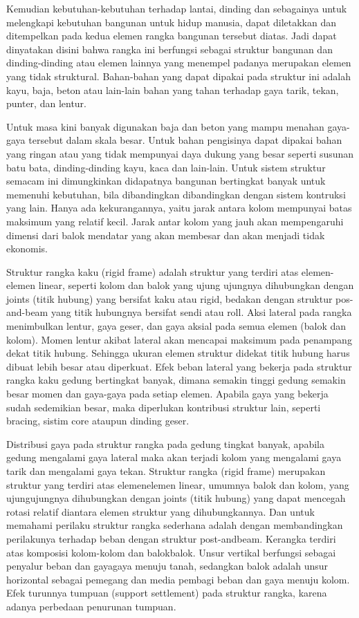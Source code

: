 \documentclass[../modul_skb.tex]{subfiles}
\begin{document}
Kemudian kebutuhan-kebutuhan terhadap lantai, dinding dan sebagainya untuk melengkapi kebutuhan bangunan untuk hidup manusia, dapat diletakkan dan ditempelkan pada kedua elemen rangka bangunan tersebut diatas. Jadi dapat dinyatakan disini bahwa rangka ini berfungsi sebagai struktur bangunan dan dinding-dinding atau elemen lainnya yang menempel padanya merupakan elemen yang tidak struktural. Bahan-bahan yang dapat dipakai pada struktur ini adalah kayu, baja, beton atau lain-lain bahan yang tahan terhadap gaya tarik, tekan, punter, dan lentur.

Untuk masa kini banyak digunakan baja dan beton yang mampu menahan gaya-gaya tersebut dalam skala besar. Untuk bahan pengisinya dapat dipakai bahan yang ringan atau yang tidak mempunyai daya dukung yang besar seperti susunan batu bata, dinding-dinding kayu, kaca dan lain-lain. Untuk sistem struktur semacam ini dimungkinkan didapatnya bangunan bertingkat banyak untuk memenuhi kebutuhan, bila dibandingkan dibandingkan dengan sistem kontruksi yang lain. Hanya ada kekurangannya, yaitu jarak antara kolom mempunyai batas maksimum yang relatif kecil. Jarak antar kolom yang jauh akan mempengaruhi dimensi dari balok mendatar yang akan membesar dan akan menjadi tidak
ekonomis.

Struktur rangka kaku (rigid frame) adalah struktur yang terdiri atas elemen-elemen linear, seperti kolom dan balok yang ujung ujungnya dihubungkan dengan joints (titik hubung) yang bersifat kaku atau rigid, bedakan dengan struktur pos-and-beam yang titik hubungnya bersifat sendi atau roll. Aksi lateral pada rangka menimbulkan lentur, gaya geser, dan gaya aksial pada semua elemen (balok dan kolom). Momen lentur akibat lateral akan mencapai maksimum pada penampang dekat titik hubung. Sehingga ukuran elemen struktur didekat titik hubung harus dibuat lebih besar atau diperkuat. Efek beban lateral yang bekerja pada struktur rangka kaku gedung bertingkat banyak, dimana semakin tinggi gedung semakin besar momen dan gaya-gaya pada setiap elemen. Apabila gaya yang bekerja sudah sedemikian besar, maka diperlukan kontribusi struktur lain, seperti bracing, sistim core ataupun dinding geser.

Distribusi gaya pada struktur rangka pada gedung tingkat banyak, apabila gedung mengalami gaya lateral maka akan terjadi kolom yang mengalami gaya tarik dan mengalami gaya tekan. Struktur rangka (rigid frame) merupakan struktur yang terdiri atas elemenelemen linear, umumnya balok dan kolom, yang ujungujungnya dihubungkan dengan joints (titik hubung) yang dapat mencegah rotasi relatif diantara elemen struktur yang dihubungkannya. Dan untuk memahami perilaku struktur rangka sederhana adalah dengan membandingkan perilakunya terhadap beban dengan struktur post-andbeam. Kerangka terdiri atas komposisi kolom-kolom dan balokbalok. Unsur vertikal berfungsi sebagai penyalur beban dan gayagaya menuju tanah, sedangkan balok adalah unsur horizontal sebagai pemegang dan media pembagi beban dan gaya menuju kolom. Efek turunnya tumpuan (support settlement) pada struktur rangka, karena adanya perbedaan penurunan tumpuan.
\end{document}
